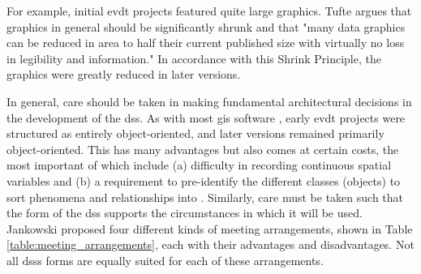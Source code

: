 For example, initial \ac{evdt} projects featured quite large graphics. Tufte argues that graphics in general should be significantly shrunk and that "many data graphics can be reduced in area to half their current published size with virtually no loss in legibility and information." \cite{tufteVisualDisplayQuantitative2001} In accordance with this Shrink Principle, the graphics were greatly reduced in later versions. 

In general, care should be taken in making fundamental architectural decisions in the development of the \ac{dss}. As with most \ac{gis} software \cite{heikkilaGISDeadLong1998}, early \ac{evdt} projects were structured as entirely object-oriented, and later versions remained primarily object-oriented. This has many advantages but also comes at certain costs, the most important of which include (a) difficulty in recording continuous spatial variables and (b) a requirement to pre-identify the different classes (objects) to sort phenomena and relationships into \cite{goodchildModelingEarth2011}. Similarly, care must be taken such that the form of the \ac{dss} supports the circumstances in which it will be used. Jankowski proposed four different kinds of meeting arrangements, shown in Table \ref{table:meeting_arrangements}, each with their advantages and disadvantages. Not all \acp{dss} forms are equally suited for each of these arrangements.

